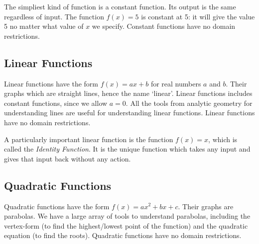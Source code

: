 \documentclass[fleqn]{report}
\begin{document}
The simpliest kind of function is a constant function. Its
output is the same regardless of input. The function
$f(x) = 5$ is constant at 5: it will give the value 5 no
matter what value of $x$ we specify. Constant functions have
no domain restrictions.

\subsection{Linear Functions}
\label{linear-functions}

Linear functions have the form $f(x) = ax + b$ for real
numbers $a$ and $b$. Their graphs which are straight lines,
hence the name `linear'. Linear functions includes constant
functions, since we allow $a=0$. All the tools from analytic
geometry for understanding lines are useful for understanding
linear functions. Linear functions have no domain
restrictions. 

A particularly important linear function is the function $f(x)
= x$, which is called the \emph{Identity Function}. It is the
unique function which takes any input and gives that input back
without any action.

\subsection{Quadratic Functions}
\label{quadratic-functions}

Quadratic functions have the form $f(x) = ax^2 + bx + c$.
Their graphs are parabolas. We have a large array of
tools to understand parabolas, including the vertex-form (to find
the highest/lowest point of the function) and the quadratic
equation (to find the roots). Quadratic functions have no
domain restrictions.

\vspace{1cm}
\end{document}
